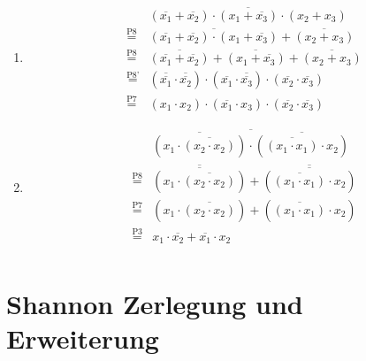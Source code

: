 \documentclass[DIN, pagenumber=false, fontsize=11pt, parskip=half]{scrartcl}
\begin{document}
    \subsection{}
    \begin{enumerate}
        \item
            \begin{eqnarray*}
                &&\overline{(\overline{x_1} + \overline{x_2}) \cdot (x_1 + \overline{x_3}) \cdot (x_2 + x_3)} \\
                &\stackrel{\text{P8}}{=}&  \overline{(\overline{x_1} + \overline{x_2}) \cdot (x_1 + \overline{x_3})} + \overline{(x_2 + x_3)}  \\
                &\stackrel{\text{P8}}{=}&  \overline{(\overline{x_1} + \overline{x_2})} + \overline{(x_1 + \overline{x_3})} + \overline{(x_2 + x_3)}  \\
                &\stackrel{\text{P8'}}{=}&  (\overline{\overline{x_1}} \cdot \overline{\overline{x_2}}) \cdot 
                                        (\overline{x_1} \cdot  \overline{\overline{x_3}}) \cdot (\overline{x_2} \cdot \overline{x_3}) \\
                &\stackrel{\text{P7}}{=}& (x_1 \cdot x_2) \cdot (\overline{x_1} \cdot x_3) \cdot (\overline{x_2} \cdot \overline{x_3})
            \end{eqnarray*}
        \item
            \begin{eqnarray*}
                &&\overline{\overline{(x_1 \cdot \overline{(x_2 \cdot x_2)})} \cdot \overline{(\overline{(x_1 \cdot x_1)}\cdot x_2 )}} \\
                &\stackrel{\text{P8}}{=}& \overline{\overline{(x_1 \cdot \overline{(x_2 \cdot x_2)})}} + \overline{\overline{(\overline{(x_1 \cdot x_1)} \cdot x_2)}} \\
                &\stackrel{\text{P7}}{=}& (x_1 \cdot \overline{(x_2 \cdot x_2)}) + (\overline{(x_1 \cdot x_1)} \cdot x_2)\\
                &\stackrel{\text{P3}}{=}& x_1 \cdot \overline{x_2} + \overline{x_1} \cdot x_2\\
            \end{eqnarray*}
    \end{enumerate}

    \section{Shannon Zerlegung und Erweiterung}
    \setcounter{subsection}{4}
\end{document}
